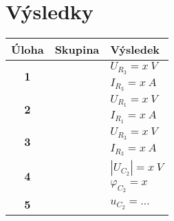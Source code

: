 \section{Výsledky}

\begin{tabularx}{\textwidth}{|c|c|X|}
	\hline
	\textbf{Úloha} & \textbf{Skupina} & \textbf{Výsledek} \\
	\hline
	\multirow{2}{*}{\textbf{1}} & & $U_{R_{3}} = x~V$ \\
	& & $I_{R_{3}} = x~A$ \\
	\hline
	\multirow{2}{*}{\textbf{2}} & & $U_{R_{1}} = x~V$ \\
	& & $I_{R_{1}} = x~A$ \\
	\hline
	\multirow{2}{*}{\textbf{3}} & & $U_{R_{3}} = x~V$ \\
	& & $I_{R_{3}} = x~A$ \\
	\hline
	\multirow{2}{*}{\textbf{4}} & & $|U_{C_{2}}| = x~V$ \\
	& & $\varphi_{C_{2}} = x$ \\
	\hline
	\textbf{5} & & $u_{C_{2}} = \dots$ \\
	\hline
\end{tabularx}